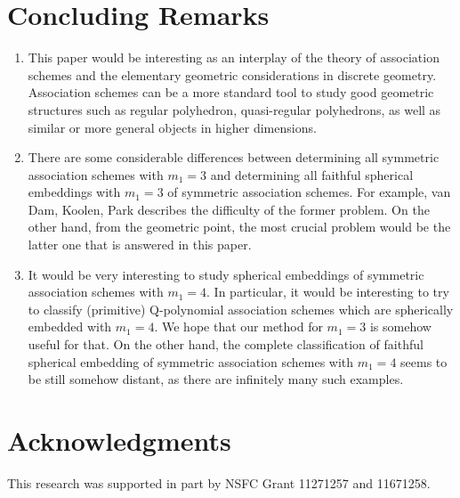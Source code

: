 \documentclass[12pt]{amsart}
\begin{document}
\section{Concluding Remarks}

\begin{enumerate}
	\item This paper would be interesting as an interplay of the theory of association schemes and the elementary geometric considerations in discrete geometry. 
	Association schemes can be a more standard tool to study good geometric structures such as regular polyhedron, quasi-regular polyhedrons, as well as similar or more general objects in higher dimensions. 
	\item There are some considerable differences between determining all symmetric association schemes with $m_1=3$ and determining all faithful spherical embeddings with $m_1=3$ of symmetric association schemes. For example, van Dam, Koolen, Park \cite[Section 2.5, page 6]{1701.03193} describes the difficulty of the former problem. On the other hand, from the geometric point, the most crucial problem would be the latter one that is answered in this paper.
	\item It would be very interesting to study spherical embeddings of symmetric association schemes with $m_1=4$. In particular, it would be interesting to try to classify (primitive) Q-polynomial association schemes which are spherically embedded with $m_1=4.$ We hope that our method for $m_1=3$ is somehow useful for that. On the other hand, the complete classification of faithful spherical embedding of symmetric association schemes with $m_1=4$ seems to be still somehow distant, as there are infinitely many such examples. 
\end{enumerate}


\section*{Acknowledgments}
This research was supported in part by NSFC Grant 11271257 and 11671258.




\end{document}
